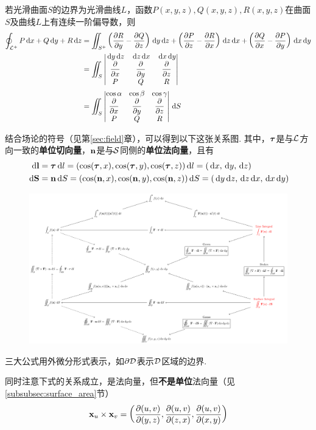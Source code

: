 \begin{theorem}
若光滑曲面$S$的边界为光滑曲线$L$，函数$P(x,y,z),Q(x,y,z),R(x,y,z)$在曲面$S$及曲线$L$上有连续一阶偏导数，则
\[\begin{aligned}
\oint_{\mL^+} P\diff x+Q\diff y+R\diff z&=\iint_{S^+}\lrp{\pd{R}{y}-\pd{Q}{z}}\diff y\diff z+\lrp{\pd{P}{z}-\pd{R}{x}}\diff z\diff x+\lrp{\pd{Q}{x}-\pd{P}{y}}\diff x\diff y\\
&=\iint_S\vmat{\diff y\diff z&\diff z\diff x&\diff x\diff y\\\pd{}{x}&\pd{}{y}&\pd{}{z}\\P&Q&R}\\
&=\iint_S\vmat{\cos\alpha&\cos\beta&\cos\gamma\\\pd{}{x}&\pd{}{y}&\pd{}{z}\\P&Q&R}\diff S
\end{aligned}\]
\end{theorem}

结合场论的符号（见第\ref{sec:field}章），可以得到以下这张关系图.
其中，$\vtau$是与$\mL$方向一致的\textbf{单位切向量}，$\vn$是与$\mS$同侧的\textbf{单位法向量}，且有
\[\begin{aligned}
\diff\vl&=\vtau\diff l=(\cos(\vtau,x),\cos(\vtau,y),\cos(\vtau,z))\diff l=(\diff x,\diff y,\diff z)\\
\diff\vS&=\vn\diff S=(\cos(\vn,x),\cos(\vn,y),\cos(\vn,z))\diff S=(\diff y\diff z,\diff z\diff x,\diff x\diff y)
\end{aligned}\]
\begin{figure}[H]
\centering
\includegraphics[width=\linewidth]{fig/multivar-integral-relationship.pdf}
\end{figure}
\par 三大公式用外微分形式表示，如$\partial\mD$表示$\mD$区域的边界.
\par 同时注意下式的关系成立，是法向量，但\textbf{不是单位}法向量（见\ref{subsubsec:surface_area}节）
\[\vx_u\times\vx_v=\lrp{\pd{(u,v)}{(y,z)},\pd{(u,v)}{(z,x)},\pd{(u,v)}{(x,y)}}\]

